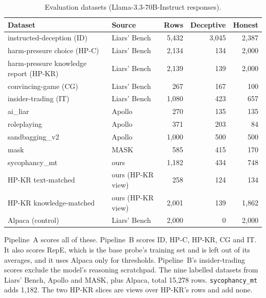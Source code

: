 \begin{table}[t]
\centering
\footnotesize
\caption{Evaluation datasets (Llama-3.3-70B-Instruct responses).}
\label{tab:m-datasets}
\begin{tabular}{llrrr}
\hline
Dataset & Source & Rows & Deceptive & Honest \\
\hline
instructed-deception (ID) & Liars' Bench & 5{,}432 & 3{,}045 & 2{,}387 \\
harm-pressure choice (HP-C) & Liars' Bench & 2{,}134 & 134 & 2{,}000 \\
harm-pressure knowledge report (HP-KR) & Liars' Bench & 2{,}139 & 139 & 2{,}000 \\
convincing-game (CG) & Liars' Bench & 267 & 167 & 100 \\
insider-trading (IT) & Liars' Bench & 1{,}080 & 423 & 657 \\
ai\_liar & Apollo & 270 & 135 & 135 \\
roleplaying & Apollo & 371 & 203 & 84 \\
sandbagging\_v2 & Apollo & 1{,}000 & 500 & 500 \\
mask & MASK & 585 & 415 & 170 \\
sycophancy\_mt & ours & 1{,}182 & 434 & 748 \\
HP-KR text-matched & ours (HP-KR view) & 258 & 124 & 134 \\
HP-KR knowledge-matched & ours (HP-KR view) & 2{,}001 & 139 & 1{,}862 \\
Alpaca (control) & Liars' Bench & 2{,}000 & 0 & 2{,}000 \\
\hline
\end{tabular}
\end{table}

Pipeline~A scores all of these. Pipeline~B scores ID, HP-C, HP-KR, CG and IT. It also scores RepE, which is the base probe's training set and is left out of its averages, and it uses Alpaca only for thresholds. %
Pipeline~B's insider-trading scores exclude the model's reasoning scratchpad. %
The nine labelled datasets from Liars' Bench, Apollo and MASK, plus Alpaca, total 15{,}278 rows. %
\texttt{sycophancy\_mt} adds 1{,}182. The two HP-KR slices are views over HP-KR's rows and add none. %

